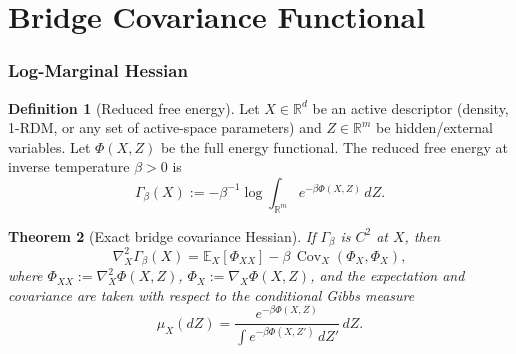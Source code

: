 \documentclass[12pt]{article}
\theoremstyle{plain}
\newtheorem{theorem}{Theorem}[section]
\theoremstyle{definition}
\newtheorem{definition}[theorem]{Definition}
\numberwithin{equation}{section}
\newcommand{\R}{\mathbb{R}}
\DeclareMathOperator{\Cov}{Cov}
\begin{document}
\part{Bridge Covariance Functional}

\section{Log-Marginal Hessian}\label{sec:hessian}

\begin{definition}[Reduced free energy]\label{def:Gamma}
Let $X\in\R^d$ be an active descriptor (density, 1-RDM, or any
set of active-space parameters) and $Z\in\R^m$ be hidden/external
variables.  Let $\Phi(X,Z)$ be the full energy functional.
The reduced free energy at inverse temperature $\beta>0$ is
\begin{equation}\label{eq:Gamma}
\Gamma_\beta(X) := -\beta^{-1}\log\int_{\R^m}
e^{-\beta\Phi(X,Z)}\,dZ.
\end{equation}
\end{definition}

\begin{theorem}[Exact bridge covariance Hessian]\label{thm:hessian}
If $\Gamma_\beta$ is $C^2$ at $X$, then
\begin{equation}\label{eq:hessian}
\boxed{\nabla_X^2\Gamma_\beta(X)
= \mathbb{E}_X[\Phi_{XX}]
- \beta\,\Cov_X(\Phi_X,\Phi_X),}
\end{equation}
where $\Phi_{XX}:=\nabla_X^2\Phi(X,Z)$,
$\Phi_X:=\nabla_X\Phi(X,Z)$, and the expectation and covariance
are taken with respect to the conditional Gibbs measure
\begin{equation}
\mu_X(dZ) = \frac{e^{-\beta\Phi(X,Z)}}
{\int e^{-\beta\Phi(X,Z')}\,dZ'}\,dZ.
\end{equation}
\end{theorem}
\end{document}
